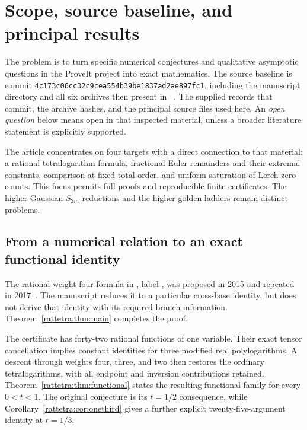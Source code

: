 \section{Scope, source baseline, and principal results}
\label{intro:sec}

The problem is to turn specific numerical conjectures and qualitative
asymptotic questions in the ProveIt project into exact mathematics.
The source baseline is commit
\texttt{4c173c06cc32c9cea554b39be1837ad2ae897fc1}, including the
manuscript directory and all six archives then present in
~\cite{baseline}. The supplied
 records that commit, the archive hashes,
and the principal source files used here. An \emph{open question} below
means open in that inspected material, unless a broader literature
statement is explicitly supported.

The article concentrates on four targets with a direct connection to
that material: a rational tetralogarithm formula, fractional Euler
remainders and their extremal constants, comparison at fixed total
order, and uniform saturation of Lerch zero counts. This focus permits
full proofs and reproducible finite certificates. The higher Gaussian
$S_{2m}$ reductions and the higher golden ladders remain distinct
problems.

\subsection{From a numerical relation to an exact functional identity}

The rational weight-four formula in
, label , was proposed in
2015 and repeated in 2017~\cite{Reshetnikov2015,Reshetnikov2017}.
The manuscript reduces it to a particular cross-base identity, but
does not derive that identity with its required branch information.
Theorem~\ref{rattetra:thm:main} completes the proof.

The certificate has forty-two rational functions of one variable.
Their exact tensor cancellation implies constant identities for three
modified real polylogarithms. A descent through weights four, three,
and two then restores the ordinary tetralogarithms, with all endpoint
and inversion contributions retained. Theorem~\ref{rattetra:thm:functional}
states the resulting functional family for every $0<t<1$.
The original conjecture is its $t=1/2$ consequence, while
Corollary~\ref{rattetra:cor:onethird} gives a further explicit
twenty-five-argument identity at $t=1/3$.

